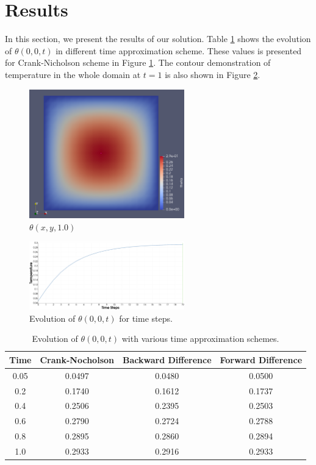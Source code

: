 \documentclass[]{article}
\begin{document}
\section{Results} \label{sec: rst}
In this section, we present the results of our solution. Table \ref{tab1} shows the evolution of $\theta(0, 0, t)$ in different time approximation scheme. These values is presented for Crank-Nicholson scheme in Figure \ref{fig_Rs}. The contour demonstration of temperature in the whole domain at $t=1$ is also shown in Figure \ref{fig_Rs2}. 
\begin{figure}[htbp]
	\centering
	\includegraphics[width=0.6\textwidth]{Figures/result1.png}
	\caption{$\theta(x, y, 1.0)$}
	\label{fig_Rs}
\end{figure}
\begin{figure}[htbp]
	\centering
	\includegraphics[width=0.6\textwidth]{Figures/result2.png}
	\caption{Evolution of $\theta(0, 0, t)$ for time steps.}
	\label{fig_Rs2}
\end{figure}
\begin{table}
	\caption{Evolution of $\theta(0, 0, t)$ with various time
		approximation schemes.}
	\label{tab1}
	\begin{center}
		\begin{tabular}{|c| c| c| c|} 
			\hline
			Time & Crank-Nocholson & Backward Difference & Forward Difference\\ [0.7ex] 
			\hline\hline
			0.05 & 0.0497 & 0.0480 & 0.0500\\  [0.2ex] 
			\hline
			0.2 & 0.1740 & 0.1612 & 0.1737\\ [0.2ex] 
			\hline
			0.4 & 0.2506 & 0.2395 & 0.2503\\ [0.2ex] 
			\hline
			0.6 & 0.2790 & 0.2724 & 0.2788\\ [0.2ex] 
			\hline
			0.8 & 0.2895 & 0.2860 & 0.2894\\ [0.2ex] 
			\hline
			1.0 & 0.2933 & 0.2916 & 0.2933\\ [0.2ex] 
			\hline
		\end{tabular}
	\end{center}
\end{table}


\end{document}
